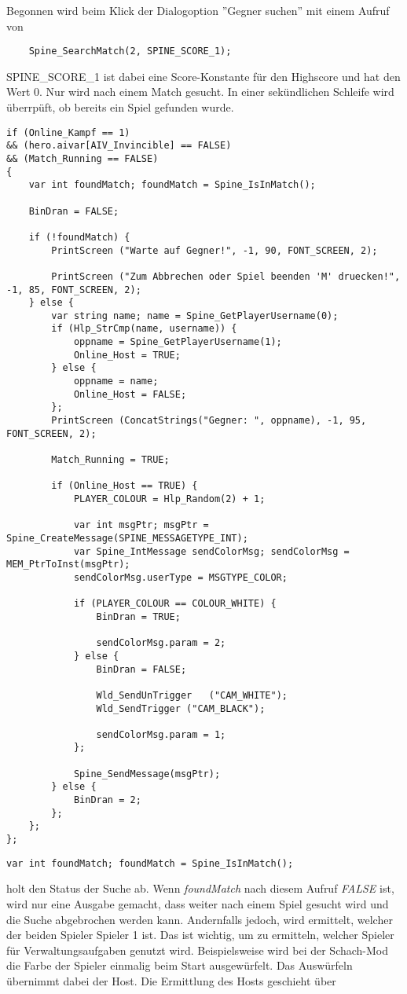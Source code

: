 \documentclass{article}
\begin{document}
Begonnen wird beim Klick der Dialogoption ''Gegner suchen'' mit einem Aufruf von

\begin{lstlisting}
	Spine_SearchMatch(2, SPINE_SCORE_1);
\end{lstlisting}

SPINE\_SCORE\_1 ist dabei eine Score-Konstante für den Highscore und hat den Wert 0. Nur wird nach einem Match gesucht. In einer sekündlichen Schleife wird überrpüft, ob bereits ein Spiel gefunden wurde.

\begin{lstlisting}
if (Online_Kampf == 1)
&& (hero.aivar[AIV_Invincible] == FALSE)
&& (Match_Running == FALSE)
{
	var int foundMatch; foundMatch = Spine_IsInMatch();

	BinDran = FALSE;

	if (!foundMatch) {
		PrintScreen	("Warte auf Gegner!", -1, 90, FONT_SCREEN, 2);

		PrintScreen	("Zum Abbrechen oder Spiel beenden 'M' druecken!", -1, 85, FONT_SCREEN, 2);
	} else {
		var string name; name = Spine_GetPlayerUsername(0);
		if (Hlp_StrCmp(name, username)) {
			oppname = Spine_GetPlayerUsername(1);
			Online_Host = TRUE;
		} else {
			oppname = name;
			Online_Host = FALSE;
		};
		PrintScreen	(ConcatStrings("Gegner: ", oppname), -1, 95, FONT_SCREEN, 2);

		Match_Running = TRUE;

		if (Online_Host == TRUE) {
			PLAYER_COLOUR = Hlp_Random(2) + 1;

			var int msgPtr; msgPtr = Spine_CreateMessage(SPINE_MESSAGETYPE_INT);
			var Spine_IntMessage sendColorMsg; sendColorMsg = MEM_PtrToInst(msgPtr);
			sendColorMsg.userType = MSGTYPE_COLOR;
				
			if (PLAYER_COLOUR == COLOUR_WHITE) {
				BinDran = TRUE;

				sendColorMsg.param = 2;
			} else {
				BinDran = FALSE;

				Wld_SendUnTrigger	("CAM_WHITE");
				Wld_SendTrigger	("CAM_BLACK");

				sendColorMsg.param = 1;
			};
				
			Spine_SendMessage(msgPtr);
		} else {
			BinDran = 2;
		};
	};
};
\end{lstlisting}

\begin{lstlisting}
var int foundMatch; foundMatch = Spine_IsInMatch();
\end{lstlisting}

holt den Status der Suche ab. Wenn \textit{foundMatch} nach diesem Aufruf \textit{FALSE} ist, wird nur eine Ausgabe gemacht, dass weiter nach einem Spiel gesucht wird und die Suche abgebrochen werden kann. Andernfalls jedoch, wird ermittelt, welcher der beiden Spieler Spieler 1 ist. Das ist wichtig, um zu ermitteln, welcher Spieler für Verwaltungsaufgaben genutzt wird. Beispielsweise wird bei der Schach-Mod die Farbe der Spieler einmalig beim Start ausgewürfelt. Das Auswürfeln übernimmt dabei der Host. Die Ermittlung des Hosts geschieht über
\end{document}
